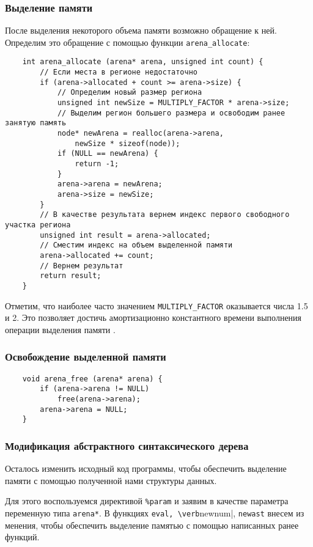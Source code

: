 \subsubsection{Выделение памяти}
После выделения некоторого объема памяти возможно обращение к ней.
Определим это обращение с помощью функции \verb|arena_allocate|:
\begin{verbatim}
    int arena_allocate (arena* arena, unsigned int count) {
        // Если места в регионе недостаточно
        if (arena->allocated + count >= arena->size) {
            // Определим новый размер региона
            unsigned int newSize = MULTIPLY_FACTOR * arena->size;
            // Выделим регион большего размера и освободим ранее занятую память
            node* newArena = realloc(arena->arena,
                newSize * sizeof(node));
            if (NULL == newArena) {
                return -1;
            }
            arena->arena = newArena;
            arena->size = newSize;
        }
        // В качестве результата вернем индекс первого свободного участка региона
        unsigned int result = arena->allocated;
        // Сместим индекс на объем выделенной памяти
        arena->allocated += count;
        // Вернем результат
        return result;
    }
\end{verbatim}

Отметим, что наиболее часто значением \verb|MULTIPLY_FACTOR| оказывается числа
1.5 и 2. Это позволяет достичь амортизационно константного времени выполнения операции выделения памяти \cite{Facebook}.

\subsubsection{Освобождение выделенной памяти}

\begin{verbatim}
    void arena_free (arena* arena) {
        if (arena->arena != NULL)
            free(arena->arena);
        arena->arena = NULL;
    }
\end{verbatim}

\subsubsection{Модификация абстрактного синтаксического дерева}
Осталось изменить исходный код программы, чтобы обеспечить выделение памяти с помощью полученной нами структуры данных.

Для этого воспользуемся директивой \verb|%param| и заявим в качестве параметра переменную типа \verb|arena*|. В функциях \verb|eval, \verb|newnum|, \verb|newast| внесем из
менения, чтобы обеспечить выделение памятью с помощью написанных ранее
функций.

